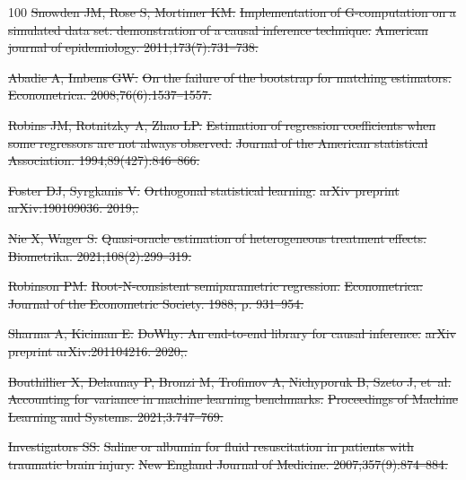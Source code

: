 \documentclass[10pt,letterpaper]{article}
\providecommand{\DIFdeltex}[1]{{\protect\color{red}\sout{#1}}}                      %
\providecommand{\DIFdelend}{} %
\providecommand{\DIFdel}[1]{\texorpdfstring{\DIFdeltex{#1}}{}} %
\DeclareRobustCommand{\DIFdelend}{\DIFOaddend \let\includegraphics\DIFOincludegraphics} %
\begin{document}
\begin{thebibliography}{100}
  \DIFdel{Snowden JM, Rose S, Mortimer KM.
  }%
  \DIFdel{Implementation of G-computation on a simulated data set: demonstration of a causal inference technique.
  }%
  \DIFdel{American journal of epidemiology. 2011;173(7):731--738.
  }%

  \DIFdel{Abadie A, Imbens GW.
  }%
  \DIFdel{On the failure of the bootstrap for matching estimators.
  }%
  \DIFdel{Econometrica. 2008;76(6):1537--1557.
  }%

  \DIFdel{Robins JM, Rotnitzky A, Zhao LP.
  }%
  \DIFdel{Estimation of regression coefficients when some regressors are not always observed.
  }%
  \DIFdel{Journal of the American statistical Association. 1994;89(427):846--866.
  }%

  \DIFdel{Foster DJ, Syrgkanis V.
  }%
  \DIFdel{Orthogonal statistical learning.
  }%
  \DIFdel{arXiv preprint arXiv:190109036. 2019;.
  }%

  \DIFdel{Nie X, Wager S.
  }%
  \DIFdel{Quasi-oracle estimation of heterogeneous treatment effects.
  }%
  \DIFdel{Biometrika. 2021;108(2):299--319.
  }%

  \DIFdel{Robinson PM.
  }%
  \DIFdel{Root-N-consistent semiparametric regression.
  }%
  \DIFdel{Econometrica: Journal of the Econometric Society. 1988; p. 931--954.
  }%

  \DIFdel{Sharma A, Kiciman E.
  }%
  \DIFdel{DoWhy: An end-to-end library for causal inference.
  }%
  \DIFdel{arXiv preprint arXiv:201104216. 2020;.
  }%

  \DIFdel{Bouthillier X, Delaunay P, Bronzi M, Trofimov A, Nichyporuk B, Szeto J, et~al.
  }%
  \DIFdel{Accounting for variance in machine learning benchmarks.
  }%
  \DIFdel{Proceedings of Machine Learning and Systems. 2021;3:747--769.
  }%

  \DIFdel{Investigators SS.
  }%
  \DIFdel{Saline or albumin for fluid resuscitation in patients with traumatic brain injury.
  }%
  \DIFdel{New England Journal of Medicine. 2007;357(9):874--884.
  }\DIFdelend

\end{thebibliography}
\end{document}
